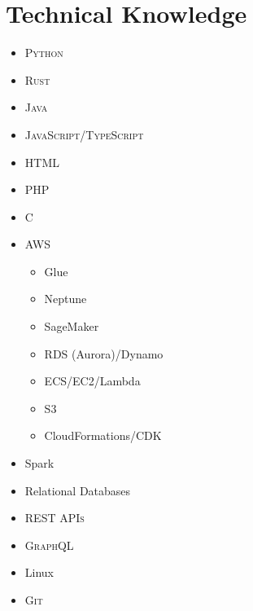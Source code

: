 \documentclass[letterpaper,10pt]{article}
\begin{document}
\pagestyle{plain}
\thispagestyle{firstpage}


\section{Technical Knowledge}
\begin{minipage}[t]{0.3\textwidth}
	\begin{itemize}
		\item \textsc{Python}
		\item \textsc{Rust}
		\item \textsc{Java}
		\item \textsc{JavaScript/TypeScript}
		\item \textsc{HTML}
		\item \textsc{PHP}
		\item \textsc{C}
	\end{itemize}
\end{minipage}
\begin{minipage}[t]{0.3\textwidth}
	\begin{itemize}
		\item AWS
		      \begin{itemize}
			      \item Glue
			      \item Neptune
			      \item SageMaker
			      \item RDS (Aurora)/Dynamo
			      \item ECS/EC2/Lambda
			      \item S3
			      \item CloudFormations/CDK
		      \end{itemize}
	\end{itemize}
\end{minipage}
\begin{minipage}[t]{0.3\textwidth}
	\begin{itemize}
		\item Spark
		\item Relational Databases
		\item \textsc{REST APIs}
		\item \textsc{GraphQL}
		\item Linux
		\item \textsc{Git}
	\end{itemize}
\end{minipage}\\
\end{document}
